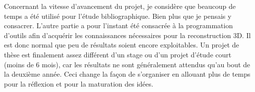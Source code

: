 \vspace{5mm}

Concernant la vitesse d'avancement du projet, je considère que beaucoup de temps a été utilisé pour l'étude bibliographique.
Bien plus que je pensais y consacrer.
L'autre partie a pour l'instant été consacrée à la programmation d'outils afin d'acquérir les connaissances nécessaires pour la reconstruction 3D.
Il est donc normal que peu de résultats soient encore exploitables.
Un projet de thèse est finalement assez différent d'un stage ou d'un projet d'étude court (moins de 6 mois), car les résultats ne sont généralement attendus qu'au bout de la deuxième année.
Ceci change la façon de s'organiser en allouant plus de temps pour la réflexion et pour la maturation des idées.
